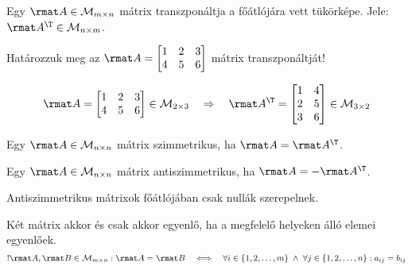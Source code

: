 \begin{definition}
  Egy $\rmat A \in \mathcal M_{m \times n}$ mátrix transzponáltja a főátlójára
  vett tükörképe. Jele: $\rmat A^\T \in \mathcal M_{n \times m}$.
\end{definition}

\begin{example}
  Határozzuk meg az $\rmat A = \begin{bmatrix}
      1 & 2 & 3 \\
      4 & 5 & 6
    \end{bmatrix}$ mátrix transzponáltját!

  \hdashrule[.8ex][x]{\dimexpr\textwidth}{1pt}{2mm 3pt}
  $$
    \rmat A = \begin{bmatrix}
      1 & 2 & 3 \\
      4 & 5 & 6
    \end{bmatrix} \in \mathcal M_{2 \times 3}
    \quad \Rightarrow \quad
    \rmat A^\T = \begin{bmatrix}
      1 & 4 \\
      2 & 5 \\
      3 & 6
    \end{bmatrix} \in \mathcal M_{3 \times 2}
  $$
\end{example}

\begin{definition}
  Egy $\rmat A \in \mathcal M_{n \times n}$ mátrix szimmetrikus, ha
  $\rmat A = \rmat A^\T$.
\end{definition}

\begin{definition}
  Egy $\rmat A \in \mathcal M_{n \times n}$ mátrix antiszimmetrikus, ha
  $\rmat A = -\rmat A^\T$.
\end{definition}

\begin{note}
  Antiszimmetrikus mátrixok főátlójában csak nullák szerepelnek.
\end{note}

\begin{definition}
  Két mátrix akkor és csak akkor egyenlő, ha a megfelelő helyeken álló elemei
  egyenlőek.
  $$
    !\rmat A, \rmat B \in \mathcal M_{m \times n}: \rmat A = \rmat B
    \quad \Longleftrightarrow \quad
    \forall i \in \{1, 2, \ldots, m\}
    \; \land \;
    \forall j \in \{1, 2, \ldots, n\}:
    a_{ij} = b_{ij}
  $$
\end{definition}

